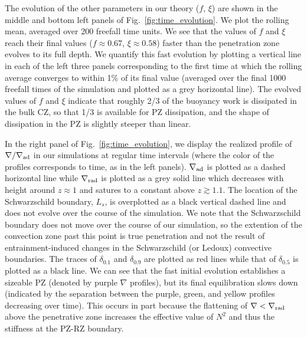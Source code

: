 \documentclass[twocolumn]{aastex631}
\newcommand{\gradrad}{\ensuremath{\nabla_{\rm{rad}}}}
\newcommand{\gradad}{\ensuremath{\nabla_{\rm{ad}}}}
\newcommand{\justgrad}{\ensuremath{\nabla}}
\begin{document}
The evolution of the other parameters in our theory ($f$, $\xi$) are shown in the middle and bottom left panels of Fig.~\ref{fig:time_evolution}.
We plot the rolling mean, averaged over 200 freefall time units. 
We see that the values of $f$ and $\xi$ reach their final values ($f \approx 0.67$, $\xi \approx 0.58$) faster than the penetration zone evolves to its full depth.
We quantify this fast evolution by plotting a vertical line in each of the left three panels corresponding to the first time at which the rolling average converges to within 1\% of its final value (averaged over the final 1000 freefall times of the simulation and plotted as a grey horizontal line).
The evolved values of $f$ and $\xi$ indicate that roughly 2/3 of the buoyancy work is dissipated in the bulk CZ, so that 1/3 is available for PZ dissipation, and the shape of dissipation in the PZ is slightly steeper than linear.

In the right panel of Fig.~\ref{fig:time_evolution}, we display the realized profile of $\justgrad/\gradad$ in our simulations at regular time intervals (where the color of the profiles corresponds to time, as in the left panels).
$\gradad$ is plotted as a dashed horizontal line while $\gradrad$ is plotted as a grey solid line which decreases with height around $z \approx 1$ and satures to a constant above $z \gtrsim 1.1$.
The location of the Schwarzschild boundary, $L_s$, is overplotted as a black vertical dashed line and does not evolve over the course of the simulation.
We note that the Schwarzschild boundary does not move over the course of our simulation, so the extention of the convection zone past this point is true penetration and not the result of entrainment-induced changes in the Schwarzschild (or Ledoux) convective boundaries.
The traces of $\delta_{0.1}$ and $\delta_{0.9}$ are plotted as red lines while that of $\delta_{0.5}$ is plotted as a black line.
We can see that the fast initial evolution establishes a sizeable PZ (denoted by purple $\justgrad$ profiles), but its final equilibration slows down (indicated by the separation between the purple, green, and yellow profiles decreasing over time).
This occurs in part because the flattening of $\justgrad < \gradrad$ above the penetrative zone increases the effective value of $N^2$ and thus the stiffness at the PZ-RZ boundary.
\end{document}
